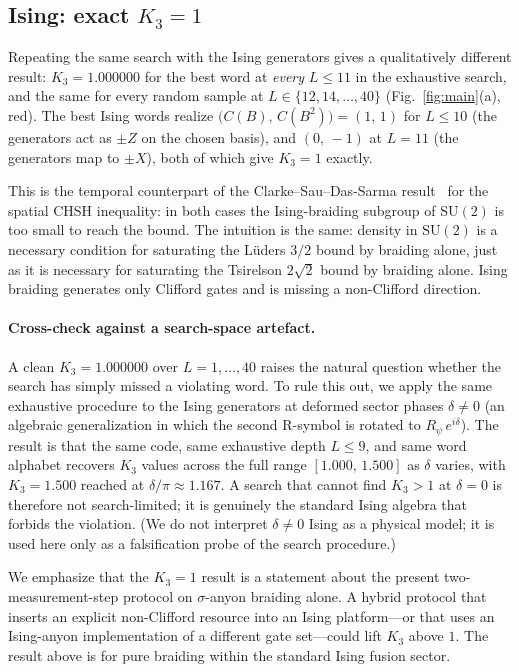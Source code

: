 \documentclass[aps,prx,reprint,amsmath,amssymb,floatfix,nofootinbib,superscriptaddress]{revtex4-2}
\begin{document}
\subsection{Ising: exact $K_{3} = 1$}
\label{sec:ising}

Repeating the same search with the Ising generators gives a
qualitatively different result: $K_{3} = 1.000000$ for the best word
at \emph{every} $L \leq 11$ in the exhaustive search, and the same
for every random sample at $L \in \{12, 14, \ldots, 40\}$
(Fig.~\ref{fig:main}(a), red). The best Ising words realize
$\bigl(C(B),\, C(B^{2})\bigr) = (1,\,1)$ for $L \leq 10$ (the
generators act as $\pm Z$ on the chosen basis), and $(0,\,-1)$ at
$L=11$ (the generators map to $\pm X$), both of which give
$K_{3} = 1$ exactly.

This is the temporal counterpart of the Clarke--Sau--Das-Sarma
result~\cite{ClarkeSauDasSarma2016} for the spatial CHSH inequality: in both
cases the Ising-braiding subgroup of $\mathrm{SU}(2)$ is too small to
reach the bound. The intuition is the same: density in
$\mathrm{SU}(2)$ is a necessary condition for saturating the L\"uders
$3/2$ bound by braiding alone, just as it is necessary for saturating
the Tsirelson $2\sqrt{2}$ bound by braiding alone. Ising braiding
generates only Clifford gates and is missing a non-Clifford direction.

\paragraph{Cross-check against a search-space artefact.}
A clean $K_{3}=1.000000$ over $L=1,\ldots,40$ raises the natural
question whether the search has simply missed a violating word. To
rule this out, we apply the same exhaustive procedure to the
Ising generators at deformed sector phases $\delta \neq 0$ (an
algebraic generalization in which the second R-symbol is rotated to
$R_{\psi}\,e^{i\delta}$). The result is that the same code, same
exhaustive depth $L \leq 9$, and same word alphabet recovers
$K_{3}$ values across the full range $[1.000,\,1.500]$ as $\delta$
varies, with $K_{3} = 1.500$ reached at $\delta/\pi \approx 1.167$.
A search that cannot find $K_{3} > 1$ at $\delta = 0$ is therefore
not search-limited; it is genuinely the standard Ising algebra that
forbids the violation. (We do not interpret $\delta \neq 0$ Ising as
a physical model; it is used here only as a falsification probe of
the search procedure.)

We emphasize that the $K_{3} = 1$ result is a statement about the
present two-measurement-step protocol on $\sigma$-anyon braiding
alone. A hybrid protocol that inserts an explicit non-Clifford
resource into an Ising platform---or that uses an Ising-anyon
implementation of a different gate set---could lift $K_{3}$ above $1$.
The result above is for pure braiding within the standard Ising
fusion sector.
\end{document}
